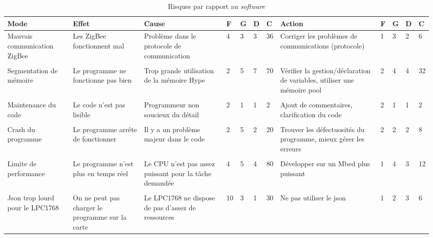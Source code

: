 \begin{table}[h]
	\centering
	\caption{Risques par rapport au \emph{software}}
	\begin{tabular}{P{2cm}P{2cm}P{2cm}llllP{2cm}llll}
		\hline
		\bf Mode & \bf Effet & \bf Cause & \bf F & \bf G & \bf D & \bf C & \bf Action & \bf F & \bf G & \bf D & \bf C  \\
		\hline
		\hline
		Mauvais communication ZigBee & Les ZigBee fonctionnent mal & Problème dans le protocole de communication & 4 & 3 & 3 & 36 & Corriger les problèmes de communications (protocole) & 1 & 3 & 2 & 6 \\\\ 
		Segmentation de mémoire & Le programme ne fonctionne pas bien & Trop grande utilisation de la mémoire Hype & 2 & 5 & 7 & 70 & Vérifier la gestion/déclaration de variables, utiliser une mémoire pool & 2 & 4 & 4 & 32 \\\\
		Maintenance du code & Le code n'est pas lisible & Programmeur non soucieux du détail & 2 & 1 & 1 & 2 & Ajout de commentaires, clarification du code & 2 & 1 & 1 & 2 \\\\
		Crash du programme & Le programme arrête de fonctionner & Il y a un problème majeur dans le code & 2 & 5 & 2 & 20 & Trouver les défectuosités du programme, mieux gérer les erreurs & 2 & 2 & 2 & 8 \\\\
		Limite de performance & Le programme n'est plus en temps réel & Le CPU n'est pas assez puissant pour la tâche demandée & 4 & 5 & 4 & 80 & Développer sur un Mbed plus puissant & 1 & 4 & 3 & 12 \\\\
		Json trop lourd pour le LPC1768 & On ne peut pas charger le programme sur la carte & Le LPC1768 ne dispose de pas d'assez de ressources & 10 & 3 & 1 & 30 & Ne pas utiliser le json & 1 & 2 & 3 & 6 \\
		
		\hline
	\end{tabular}
\end{table}
